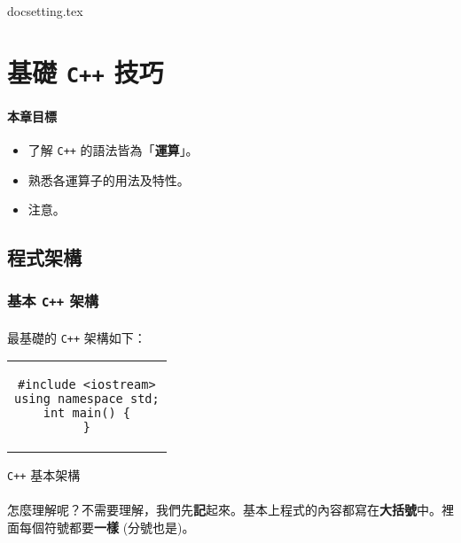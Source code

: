 \documentclass[12pt,a4paper,oneside]{article}
\begin{document}
\begin{CJK}{UTF8}{bkai}

{docsetting.tex}
\setcounter{section}{0}

\fi

\providecommand*\probpath{../uva.data/problem/store/}

\section{基礎 \texttt{C++} 技巧}

\paragraph{本章目標}
\begin{itemize}
\item 了解 \texttt{C++} 的語法皆為「\textbf{運算}」。
\item 熟悉各運算子的用法及特性。
\item 注意。
\end{itemize}

\subsection{程式架構}
\subsubsection{基本 \texttt{C++} 架構}

\paragraph{}最基礎的 \texttt{C++} 架構如下：

\begin{code}[h!]
\centering
\begin{tabular}{c}
\begin{lstlisting}
#include <iostream>
using namespace std;
int main() {
}
\end{lstlisting}
\end{tabular}
\caption{\texttt{C++} 基本架構}
\label{basic:cpp:code:main}
\end{code}

\paragraph{}怎麼理解呢？不需要理解，我們先\textbf{記}起來。基本上程式的內容都寫在\textbf{大括號}中。裡面每個符號都要\textbf{一樣} (分號也是)。

\end{CJK}
\end{document}

